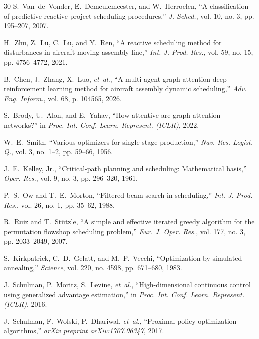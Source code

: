 \documentclass[journal,10pt]{IEEEtran}
\begin{document}
\begin{thebibliography}{30}
S.~Van~de~Vonder, E.~Demeulemeester, and W.~Herroelen, ``A classification of predictive-reactive project scheduling procedures,'' \textit{J. Sched.}, vol. 10, no. 3, pp. 195--207, 2007.

H.~Zhu, Z.~Lu, C.~Lu, and Y.~Ren, ``A reactive scheduling method for disturbances in aircraft moving assembly line,'' \textit{Int. J. Prod. Res.}, vol. 59, no. 15, pp. 4756--4772, 2021.

B.~Chen, J.~Zhang, X.~Luo, \textit{et~al.}, ``A multi-agent graph attention deep reinforcement learning method for aircraft assembly dynamic scheduling,'' \textit{Adv. Eng. Inform.}, vol. 68, p. 104565, 2026.

S.~Brody, U.~Alon, and E.~Yahav, ``How attentive are graph attention networks?'' in \textit{Proc. Int. Conf. Learn. Represent. (ICLR)}, 2022.

W.~E.~Smith, ``Various optimizers for single-stage production,'' \textit{Nav. Res. Logist. Q.}, vol. 3, no. 1--2, pp. 59--66, 1956.

J.~E.~Kelley, Jr., ``Critical-path planning and scheduling: Mathematical basis,'' \textit{Oper. Res.}, vol. 9, no. 3, pp. 296--320, 1961.

P.~S.~Ow and T.~E.~Morton, ``Filtered beam search in scheduling,'' \textit{Int. J. Prod. Res.}, vol. 26, no. 1, pp. 35--62, 1988.

R.~Ruiz and T.~St\"utzle, ``A simple and effective iterated greedy algorithm for the permutation flowshop scheduling problem,'' \textit{Eur. J. Oper. Res.}, vol. 177, no. 3, pp. 2033--2049, 2007.

S.~Kirkpatrick, C.~D.~Gelatt, and M.~P.~Vecchi, ``Optimization by simulated annealing,'' \textit{Science}, vol. 220, no. 4598, pp. 671--680, 1983.

J.~Schulman, P.~Moritz, S.~Levine, \textit{et~al.}, ``High-dimensional continuous control using generalized advantage estimation,'' in \textit{Proc. Int. Conf. Learn. Represent. (ICLR)}, 2016.

J.~Schulman, F.~Wolski, P.~Dhariwal, \textit{et~al.}, ``Proximal policy optimization algorithms,'' \textit{arXiv preprint arXiv:1707.06347}, 2017.
\end{thebibliography}
\end{document}

